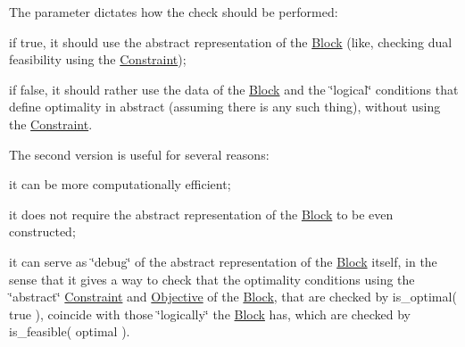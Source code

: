 The parameter dictates how the check should be performed\+:


\begin{DoxyItemize}
\item if true, it should use the abstract representation of the \mbox{\hyperlink{class_s_m_spp__di__unipi__it_1_1_block}{Block}} (like, checking dual feasibility using the \mbox{\hyperlink{class_s_m_spp__di__unipi__it_1_1_constraint}{Constraint}});
\item if false, it should rather use the data of the \mbox{\hyperlink{class_s_m_spp__di__unipi__it_1_1_block}{Block}} and the \char`\"{}logical\char`\"{} conditions that define optimality in abstract (assuming there is any such thing), without using the \mbox{\hyperlink{class_s_m_spp__di__unipi__it_1_1_constraint}{Constraint}}.
\end{DoxyItemize}

The second version is useful for several reasons\+:


\begin{DoxyItemize}
\item it can be more computationally efficient;
\item it does not require the abstract representation of the \mbox{\hyperlink{class_s_m_spp__di__unipi__it_1_1_block}{Block}} to be even constructed;
\item it can serve as \char`\"{}debug\char`\"{} of the abstract representation of the \mbox{\hyperlink{class_s_m_spp__di__unipi__it_1_1_block}{Block}} itself, in the sense that it gives a way to check that the optimality conditions using the \char`\"{}abstract\char`\"{} \mbox{\hyperlink{class_s_m_spp__di__unipi__it_1_1_constraint}{Constraint}} and \mbox{\hyperlink{class_s_m_spp__di__unipi__it_1_1_objective}{Objective}} of the \mbox{\hyperlink{class_s_m_spp__di__unipi__it_1_1_block}{Block}}, that are checked by is\+\_\+optimal( true ), coincide with those \char`\"{}logically\char`\"{} the \mbox{\hyperlink{class_s_m_spp__di__unipi__it_1_1_block}{Block}} has, which are checked by is\+\_\+feasible( optimal ).
\end{DoxyItemize}

